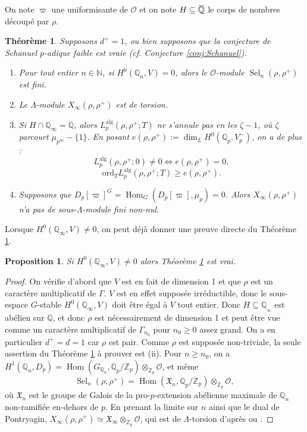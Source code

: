 \documentclass[12pt]{amsart}
\newcommand\bN{\mathbb{N}}
\newcommand\bQ{\mathbb{Q}}
\newcommand\Zp{{\mathbb{Z}_{p}}}
\newcommand\Qp{\mathbb{Q}_{p}}
\newcommand\cO{\mathcal{O}}
\newcommand\gX{\mathfrak{X}}
\newcommand{\ob}[1]{\mkern 1.5mu\overline{\mkern-1.5mu#1\mkern-1.5mu}\mkern 1.5mu}
\newcommand{\ord}{\mathrm{ord}}
\newcommand{\alg}{\textrm{alg}}
\DeclareMathOperator{\Hom}{Hom}
\DeclareMathOperator{\Sel}{Sel}
\theoremstyle{defstyle}
\theoremstyle{thmstyle}
\newtheorem{theorem}[subsubsection]{Théorème}
\newtheorem{proposition}[subsubsection]{Proposition}
\begin{document}
On note $\varpi$ une uniformisante de $\cO$ et on note $H\subseteq \ob{\bQ}$ le corps de nombres découpé par $\rho$.

\begin{theorem}\label{th:sel_n_fini_etc}
	Supposons $d^+=1$, ou bien supposons que la conjecture de Schanuel $p$-adique faible est vraie (cf. Conjecture \ref{conj:Schanuel}).
	\begin{enumerate}
		
		\item[(i)] Pour tout entier $n\in\bN$, si $H^0(\bQ_n,V)=0$, alors le $\cO$-module $\Sel_n(\rho,\rho^+)$ est fini.
		\item[(ii)] Le $\Lambda$-module $X_\infty(\rho,\rho^+)$ est de torsion.
		\item[(iii)] Si $H\cap \bQ_\infty =\bQ$, alors $L_p^{\alg}(\rho,\rho^+;T)$ ne s'annule pas en les $\zeta-1$, où $\zeta$ parcourt $\mu_{p^\infty}-\{1\}$. En posant $e(\rho,\rho^+):=\dim_L H^0(\Qp,V_p^-)$, on a de plus :
		$$L_p^{\alg}(\rho,\rho^+;0)\neq 0 \Longleftrightarrow e(\rho,\rho^+)=0,$$  
		$$\ord_{T} L_p^{\alg}(\rho,\rho^+;T) \geq e(\rho,\rho^+).$$
		
		\item[(iv)] Supposons que $D_p[\varpi]^G=\Hom_G(D_p[\varpi],\mu_p)=0$. Alors $X_\infty(\rho,\rho^+)$ n'a pas de sous-$\Lambda$-module fini non-nul.
	\end{enumerate}
\end{theorem}

Lorsque $H^0(\bQ_\infty,V)\neq 0$, on peut déjà donner une preuve directe du Théorème \ref{th:sel_n_fini_etc}.
 
 \begin{proposition}
 	Si $H^0(\bQ_\infty,V)\neq 0$ alors Théorème \ref{th:sel_n_fini_etc} est vrai.
 \end{proposition}
\begin{proof}
	On vérifie d'abord que $V$ est en fait de dimension 1 et que $\rho$ est un caractère multiplicatif de $\Gamma$. $V$ est en effet supposée irréductible, donc le sous-espace $G$-stable $H^0(\bQ_\infty,V)$ doit être égal à $V$ tout entier. Donc $H\subseteq \bQ_{_\infty}$ est abélien sur $\bQ$, et donc $\rho$ est nécessairement de dimension 1 et peut être vue comme un caractère multiplicatif de $\Gamma_{n_0}$ pour $n_0\geq 0$ assez grand. On a en particulier $d^+=d=1$ car $\rho$ est pair. Comme $\rho$ est supposée non-triviale, la seule assertion du Théorème \ref{th:sel_n_fini_etc} à prouver est (ii). Pour $n\geq n_0$, on a $H^1(\bQ_n,D_p)=\Hom(G_{\bQ_n}, \Qp/\Zp)\otimes_{\Zp} \cO$, et même 
	$$\Sel_n(\rho,\rho^+)=\Hom(\gX_n, \Qp/\Zp)\otimes_{\Zp} \cO,$$
	où $\gX_n$ est le groupe de Galois de la pro-$p$-extension abélienne maximale de $\bQ_n$ non-ramifiée en-dehors de $p$. En prenant la limite sur $n$ ainsi que le dual de Pontryagin, $X_\infty(\rho,\rho^+)\simeq \gX_\infty \otimes_{\Zp}\cO$, qui est de $\Lambda$-torsion d'après \cite[Theorem 17]{iwasawa1973zl} ou \cite[Theorem 13.31]{washington1997introduction}.
\end{proof}
\end{document}
